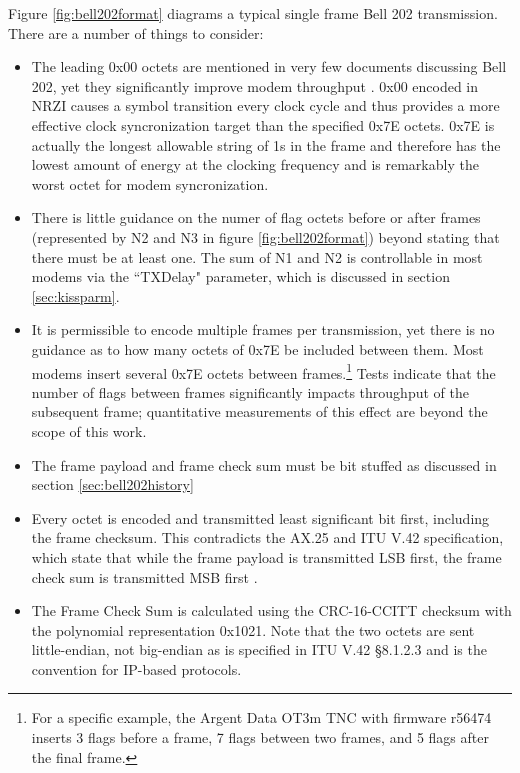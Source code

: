 Figure \ref{fig:bell202format} diagrams a typical single frame
Bell 202 transmission. There are a number of things to
consider:
\begin{itemize}
	\item The leading 0x00 octets are mentioned in very few documents
		discussing Bell 202, yet they significantly improve modem
		throughput \cite{millerinterview}. 
		0x00 encoded in NRZI causes a symbol transition
		every clock cycle and thus provides a more effective clock 
		syncronization target than the specified 0x7E octets. 0x7E is actually 
		the longest allowable string of 1s in the frame and 
		therefore has the lowest amount of energy at the clocking frequency
		and is remarkably the worst octet for modem syncronization.
	\item There is little guidance on the numer of flag octets before
		or after frames (represented by N2 and N3 in 
		figure \ref{fig:bell202format})
		beyond stating that there must be at least one. The sum of
		N1 and N2 is controllable in most modems via the ``TXDelay" parameter,
		which is discussed in section \ref{sec:kissparm}.
	\item It is permissible to encode multiple 
		frames per transmission, yet there is no guidance as to how
		many octets of 0x7E be included between them.
		Most modems insert several 0x7E octets between 
		frames.\footnote{For a specific example, the Argent Data OT3m TNC 
			with firmware r56474 inserts 3 flags before
		a frame, 7 flags between two frames, and 5 flags after the final frame.}
		Tests indicate that the number of flags between frames 
		significantly impacts throughput of the subsequent frame;
		quantitative measurements of this effect are beyond the 
		scope of this work.
	\item The frame payload and frame check sum must be bit stuffed as
		discussed in section \ref{sec:bell202history}
	\item Every octet is encoded and transmitted least significant bit first,
		including the frame checksum.
		This contradicts the AX.25 and ITU V.42 specification, 
		which state
		that while the frame payload is transmitted LSB first, the frame
		check sum is transmitted MSB first 
		\cite[\S3.8]{ax25spec}\cite{n1vgphy}\cite[\S8.1.2.2-3]{ituv42}.
	\item The Frame Check Sum is calculated using the CRC-16-CCITT checksum
		with the polynomial representation 0x1021. 
		Note that the two octets are sent little-endian, not
		big-endian as is specified in ITU V.42 \S8.1.2.3 and is the
		convention for IP-based protocols.

\end{itemize}

